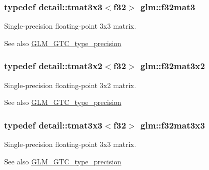 \subsubsection[{f32mat3}]{\setlength{\rightskip}{0pt plus 5cm}typedef detail\+::tmat3x3$<$f32$>$ {\bf glm\+::f32mat3}}\label{group__gtc__type__precision_gadc036a0da6d6b14996ece8884896a0e6}
Single-\/precision floating-\/point 3x3 matrix. \begin{DoxySeeAlso}{See also}
\hyperlink{group__gtc__type__precision}{G\+L\+M\+\_\+\+G\+T\+C\+\_\+type\+\_\+precision} 
\end{DoxySeeAlso}
\hypertarget{group__gtc__type__precision_gadf01336f427b8b6918bcad610cfc2fd6}{}
\subsubsection[{f32mat3x2}]{\setlength{\rightskip}{0pt plus 5cm}typedef detail\+::tmat3x2$<$f32$>$ {\bf glm\+::f32mat3x2}}\label{group__gtc__type__precision_gadf01336f427b8b6918bcad610cfc2fd6}
Single-\/precision floating-\/point 3x2 matrix. \begin{DoxySeeAlso}{See also}
\hyperlink{group__gtc__type__precision}{G\+L\+M\+\_\+\+G\+T\+C\+\_\+type\+\_\+precision} 
\end{DoxySeeAlso}
\hypertarget{group__gtc__type__precision_ga5784742e2a453a8df85e7453a1386189}{}
\subsubsection[{f32mat3x3}]{\setlength{\rightskip}{0pt plus 5cm}typedef detail\+::tmat3x3$<$f32$>$ {\bf glm\+::f32mat3x3}}\label{group__gtc__type__precision_ga5784742e2a453a8df85e7453a1386189}
Single-\/precision floating-\/point 3x3 matrix. \begin{DoxySeeAlso}{See also}
\hyperlink{group__gtc__type__precision}{G\+L\+M\+\_\+\+G\+T\+C\+\_\+type\+\_\+precision} 
\end{DoxySeeAlso}
\hypertarget{group__gtc__type__precision_ga6ca7c9195aeb5fdc8a6b8dcba6ce4ab3}{}
